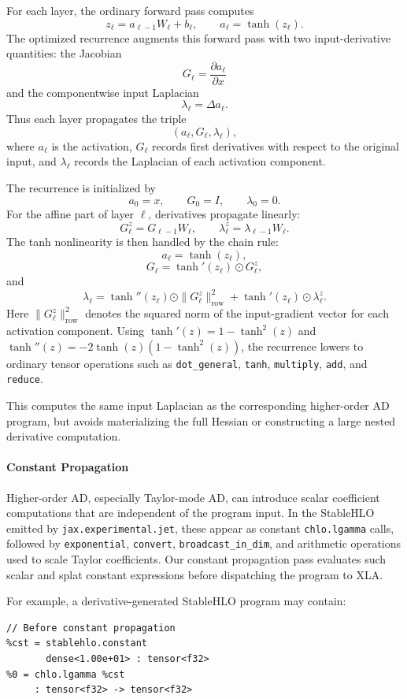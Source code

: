 \documentclass{article}
\theoremstyle{plain}
\theoremstyle{definition}
\theoremstyle{remark}
\begin{document}
For each layer, the ordinary forward pass computes
\[
  z_\ell = a_{\ell-1}W_\ell + b_\ell,
  \qquad
  a_\ell = \tanh(z_\ell).
\]
The optimized recurrence augments this forward pass with two input-derivative
quantities: the Jacobian
\[
  G_\ell = \frac{\partial a_\ell}{\partial x}
\]
and the componentwise input Laplacian
\[
  \lambda_\ell = \Delta a_\ell .
\]
Thus each layer propagates the triple
\[
  (a_\ell, G_\ell, \lambda_\ell),
\]
where \(a_\ell\) is the activation, \(G_\ell\) records first derivatives with
respect to the original input, and \(\lambda_\ell\) records the Laplacian of
each activation component.

The recurrence is initialized by
\[
  a_0 = x,
  \qquad
  G_0 = I,
  \qquad
  \lambda_0 = 0.
\]
For the affine part of layer \(\ell\), derivatives propagate linearly:
\[
  G^z_\ell = G_{\ell-1} W_\ell,
  \qquad
  \lambda^z_\ell = \lambda_{\ell-1} W_\ell .
\]
The tanh nonlinearity is then handled by the chain rule:
\[
  a_\ell = \tanh(z_\ell),
\]
\[
  G_\ell =
    \tanh'(z_\ell) \odot G^z_\ell,
\]
and
\[
  \lambda_\ell =
    \tanh''(z_\ell) \odot
      \|G^z_\ell\|_{\mathrm{row}}^2
    +
    \tanh'(z_\ell) \odot \lambda^z_\ell .
\]
Here \(\|G^z_\ell\|_{\mathrm{row}}^2\) denotes the squared norm of the
input-gradient vector for each activation component. Using $\tanh'(z) = 1 - \tanh^2(z)$ and $\tanh''(z) = -2\tanh(z)(1-\tanh^2(z))$,
the recurrence lowers to ordinary tensor operations such as
\texttt{dot\_general}, \texttt{tanh}, \texttt{multiply}, \texttt{add}, and
\texttt{reduce}.

This computes the same input Laplacian as the corresponding higher-order AD
program, but avoids materializing the full Hessian or constructing a large
nested derivative computation.


\paragraph{Constant Propagation}
Higher-order AD, especially Taylor-mode AD, can introduce scalar coefficient
computations that are independent of the program input. In the StableHLO emitted
by \texttt{jax.experimental.jet}, these appear as constant \texttt{chlo.lgamma}
calls, followed by \texttt{exponential}, \texttt{convert},
\texttt{broadcast\_in\_dim}, and arithmetic operations used to scale Taylor
coefficients. Our constant propagation pass evaluates such scalar and splat
constant expressions before dispatching the program to XLA.

For example, a derivative-generated StableHLO program may contain:
\begin{verbatim}
// Before constant propagation
%cst = stablehlo.constant
       dense<1.00e+01> : tensor<f32>
%0 = chlo.lgamma %cst
     : tensor<f32> -> tensor<f32>
\end{verbatim}
\end{document}

